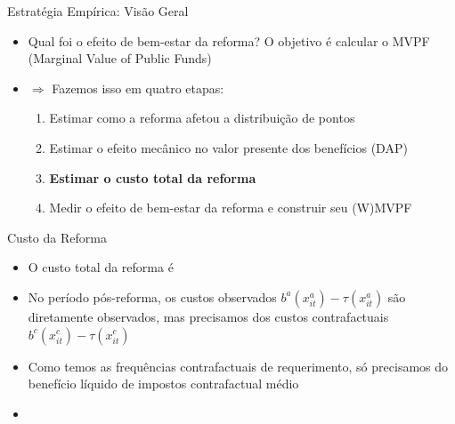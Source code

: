 \begin{frame}{Estratégia Empírica: Visão Geral}
\begin{itemize}
    \item Qual foi o efeito de bem-estar da reforma? O objetivo é calcular o MVPF (Marginal Value of Public Funds)
    \item[] $\Rightarrow$  Fazemos isso em quatro etapas:
    \begin{enumerate}
        \item Estimar como a reforma afetou a distribuição de pontos
        \item {Estimar o efeito mecânico no valor presente dos benefícios (DAP)}
        \item \textbf{Estimar o custo total da reforma}
        \item Medir o efeito de bem-estar da reforma e construir seu (W)MVPF
    \end{enumerate}
\end{itemize}
\end{frame}

\begin{frame}[label=costReform]{Custo da Reforma}
    \begin{itemize}
        \item O custo total da reforma é
    \end{itemize}
    \begin{itemize}
        \item No período pós-reforma, os custos observados $b^a(x_{it}^a)-\tau(x_{it}^a)$ são diretamente observados, mas precisamos dos custos contrafactuais $b^c(x^c_{it})-\tau(x^c_{it})$
        \item Como temos as frequências contrafactuais de requerimento, só precisamos do benefício líquido de impostos contrafactual médio
        \item {}
    \end{itemize}
\end{frame}

